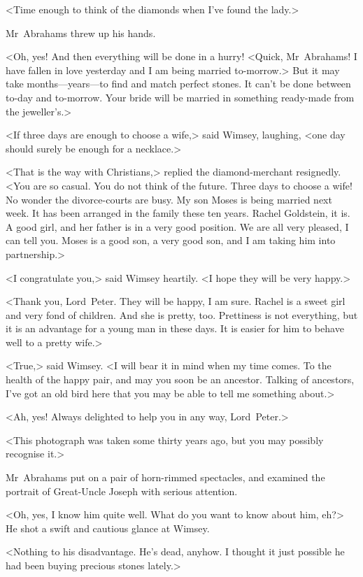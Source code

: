 <Time enough to think of the diamonds when I've found the lady.>

Mr~Abrahams threw up his hands.

<Oh, yes! And then everything will be done in a hurry! <Quick, Mr~Abrahams! I have fallen in love yesterday and I am being married to-morrow.> But it may take months—years—to find and match perfect stones. It can't be done between to-day and to-morrow. Your bride will be married in something ready-made from the jeweller's.>

<If three days are enough to choose a wife,> said Wimsey, laughing, <one day should surely be enough for a necklace.>

<That is the way with Christians,> replied the diamond-merchant resignedly. <You are so casual. You do not think of the future. Three days to choose a wife! No wonder the divorce-courts are busy. My son Moses is being married next week. It has been arranged in the family these ten years. Rachel Goldstein, it is. A good girl, and her father is in a very good position. We are all very pleased, I can tell you. Moses is a good son, a very good son, and I am taking him into partnership.>

<I congratulate you,> said Wimsey heartily. <I hope they will be very happy.>

<Thank you, Lord~Peter. They will be happy, I am sure. Rachel is a sweet girl and very fond of children. And she is pretty, too. Prettiness is not everything, but it is an advantage for a young man in these days. It is easier for him to behave well to a pretty wife.>

<True,> said Wimsey. <I will bear it in mind when my time comes. To the health of the happy pair, and may you soon be an ancestor. Talking of ancestors, I've got an old bird here that you may be able to tell me something about.>

<Ah, yes! Always delighted to help you in any way, Lord~Peter.>

<This photograph was taken some thirty years ago, but you may possibly recognise it.>

Mr~Abrahams put on a pair of horn-rimmed spectacles, and examined the portrait of Great-Uncle Joseph with serious attention.

<Oh, yes, I know him quite well. What do you want to know about him, eh?> He shot a swift and cautious glance at Wimsey.

<Nothing to his disadvantage. He's dead, anyhow. I thought it just possible he had been buying precious stones lately.>

